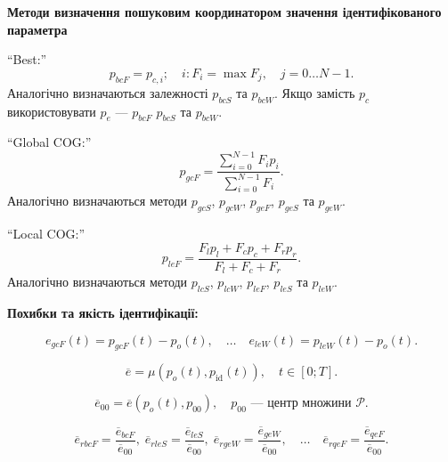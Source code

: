 \documentclass[14pt,handout,utf8]{beamer}
\newcommand{\Xhead}[1]{
 \begin{center}%
      \textbf{#1}%
 \end{center}%
}
\begin{document}

\begin{frame}
  \frametitle{~}

  \Xhead{Методи визначення пошуковим координатором значення ідентифікованого параметра}

``Best:''
\begin{equation}
  p_{bcF}
  =
  p_{c,i};
  \quad
  i : F_i = \max{F_j}, \quad j=0 \ldots N-1 .
  \label{atu:eq:p_bcF}
\end{equation}
%
Аналогічно визначаються залежності
$p_{bcS}$ та $p_{bcW}$. Якщо замість $p_c$ використовувати $p_e$ ---
$p_{bcF}$ $p_{bcS}$ та $p_{bcW}$.

\vfill

``Global COG:''
%
\begin{equation}
  p_{gcF}
  =
  \frac{\sum\limits_{i=0}^{N-1} F_{i} p_{i}}
       {\sum\limits_{i=0}^{N-1} F_{i} }
  .
  \label{atu:eq:p_gcF}
\end{equation}
%
Аналогічно визначаються методи
$p_{gcS}$,
$p_{gcW}$,
$p_{geF}$,
$p_{geS}$ та
$p_{geW}$.

\vfill

``Local COG:''
%
\begin{equation}
  p_{leF}
  =
  \frac{ F_{l} p_{l} + F_{c} p_{c} + F_{r} p_{r} }
       { F_{l}       + F_{c}       + F_{r}       }
  .
  \label{atu:eq:p_lcFl}
\end{equation}
%
Аналогічно визначаються методи
$p_{lcS}$,
$p_{lcW}$,
$p_{leF}$,
$p_{leS}$ та
$p_{leW}$.

\Xhead{Похибки та якість ідентифікації:}

\begin{equation}
  e_{gcF}(t) = p_{gcF}(t) - p_o(t),
  \quad
  \ldots
  \quad
  e_{leW}(t) = p_{leW}(t) - p_o(t).
  \label{atu:eq:e_xx}
\end{equation}

\begin{equation}
  \overline{e} = \mu( p_o(t), p_\mathrm{id}(t) ),
  \quad
  t \in [0;T].
\label{atu:eq:e_mu}
\end{equation}

\begin{equation}
  \overline{e}_{00}
  =
  \overline{e}\left(p_o(t),p_{00}\right),
  \quad
  p_{00} \text{ --- центр  множини } \mathcal{P}.
  \label{atu:eq:e_00}
\end{equation}

\begin{equation}
  \overline{e}_{rbcF} = \frac{\overline{e}_{bcF}}{\overline{e}_{00}}, \;
  \overline{e}_{rleS} = \frac{\overline{e}_{leS}}{\overline{e}_{00}}, \;
  \overline{e}_{rgeW} = \frac{\overline{e}_{geW}}{\overline{e}_{00}},
  \quad \ldots \quad
  \overline{e}_{rqeF} = \frac{\overline{e}_{qeF}}{\overline{e}_{00}}.
  \label{atu:eq:e_rxx}
\end{equation}


\end{frame}
\end{document}
